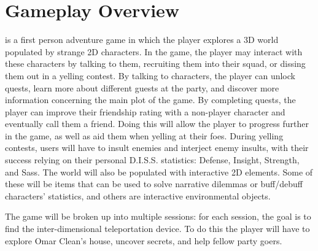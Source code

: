 \section{Gameplay Overview}
\ourgame{} is a first person adventure game in which the player explores a 3D world populated by strange 2D characters. In the game, the player may interact with these characters by talking to them, recruiting them into their squad, or dissing them out in a yelling contest. By talking to characters, the player can unlock quests, learn more about different guests at the party, and discover more information concerning the main plot of the game. By completing quests, the player can improve their friendship rating with a non-player character and eventually call them a friend. Doing this will allow the player to progress further in the game, as well as aid them when yelling at their foes. During yelling contests, users will have to insult enemies and interject enemy insults, with their success relying on their personal D.I.S.S. statistics: Defense, Insight, Strength, and Sass. The world will also be populated with interactive 2D elements. Some of these will be items that can be used to solve narrative dilemmas or buff/debuff characters' statistics, and others are interactive environmental objects.

The game will be broken up into multiple sessions: for each session, the goal is to find the inter-dimensional teleportation device. To do this the player will have to explore Omar Clean's house, uncover secrets, and help fellow party goers. 